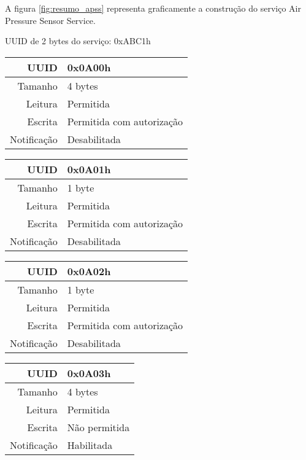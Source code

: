 A figura \ref{fig:resumo_apss} representa graficamente a construção do serviço
Air Pressure Sensor Service.

\begin{tcolorbox}[arc=3mm,fontupper=\small,fonttitle=\bfseries,
subtitle style={boxrule=0.4pt, colback=white},colframe=green!25!black,
halign=center,bottom=0mm,
title=Air Pressure Sensor Service]
	UUID de 2 bytes do serviço: 0xABC1h
	
	\begin{tcbitemize}[raster columns=2,raster equal height,fontupper=\footnotesize,
	colbacktitle=yellow!100!red!100!black, coltitle=black,
	fonttitle=\footnotesize\bfseries,size=small, halign=center]
	
	\tcbitem [squeezed title={Sensing Interval Characteristic}]
		\begin{tabular}{ r | l }
		UUID & 0x0A00h \\ \hline
		Tamanho & 4 bytes \\ \hline
		Leitura & Permitida \\ \hline
		Escrita & Permitida com autorização \\ \hline
		Notificação & Desabilitada 
		\end{tabular}

		\tcbitem [squeezed title={Sensor Status Characteristic}]
		\begin{tabular}{ r | l }
		UUID & 0x0A01h \\ \hline
		Tamanho & 1 byte \\ \hline
		Leitura & Permitida \\ \hline
		Escrita & Permitida com autorização \\ \hline
		Notificação & Desabilitada 
		\end{tabular}
		
		\tcbitem [squeezed title={Sensor Resolution Characteristic}]
		\begin{tabular}{ r | l }
		UUID & 0x0A02h \\ \hline
		Tamanho & 1 byte \\ \hline
		Leitura & Permitida \\ \hline
		Escrita & Permitida com autorização \\ \hline
		Notificação & Desabilitada 
		\end{tabular}

		\tcbitem [squeezed title={Pressure Data Characteristic}]
		\begin{tabular}{ r | l }
		UUID & 0x0A03h \\ \hline
		Tamanho & 4 bytes \\ \hline
		Leitura & Permitida \\ \hline
		Escrita & Não permitida \\ \hline
		Notificação & Habilitada 
		\end{tabular}
		

\end{tcbitemize}
\end{tcolorbox}
